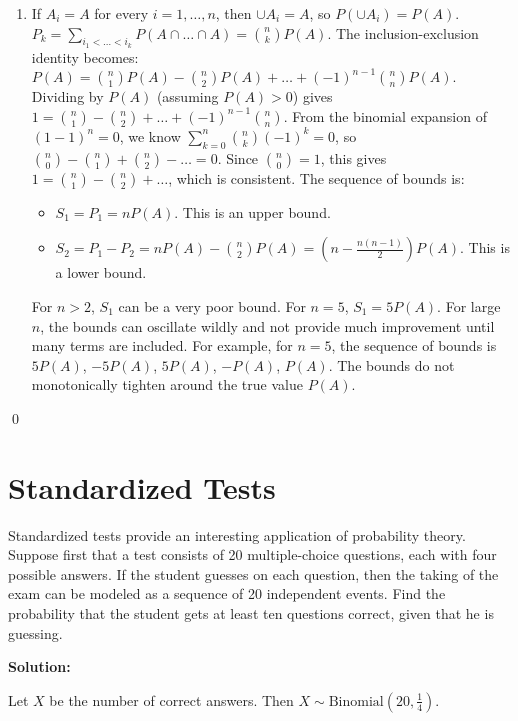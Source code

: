 \begin{enumerate}[label=(\alph*)]
    \item If $A_i=A$ for every $i=1, \dots, n$, then $\cup A_i = A$, so $P(\cup A_i) = P(A)$.
    $P_k = \sum_{i_1 < \dots < i_k} P(A \cap \dots \cap A) = \binom{n}{k} P(A)$.
    The inclusion-exclusion identity becomes: $P(A) = \binom{n}{1}P(A) - \binom{n}{2}P(A) + \dots + (-1)^{n-1}\binom{n}{n}P(A)$.
    Dividing by $P(A)$ (assuming $P(A)>0$) gives $1 = \binom{n}{1} - \binom{n}{2} + \dots + (-1)^{n-1}\binom{n}{n}$.
    From the binomial expansion of $(1-1)^n = 0$, we know $\sum_{k=0}^n \binom{n}{k}(-1)^k = 0$, so $\binom{n}{0} - \binom{n}{1} + \binom{n}{2} - \dots = 0$. Since $\binom{n}{0}=1$, this gives $1 = \binom{n}{1} - \binom{n}{2} + \dots$, which is consistent.
    \vspace{1ex} %
    The sequence of bounds is:
    \begin{itemize}
        \item $S_1 = P_1 = nP(A)$. This is an upper bound.
        \item $S_2 = P_1 - P_2 = nP(A) - \binom{n}{2}P(A) = (n - \frac{n(n-1)}{2})P(A)$. This is a lower bound.
    \end{itemize}
    For $n > 2$, $S_1$ can be a very poor bound. For $n=5$, $S_1=5P(A)$. For large $n$, the bounds can oscillate wildly and not provide much improvement until many terms are included. For example, for $n=5$, the sequence of bounds is $5P(A)$, $-5P(A)$, $5P(A)$, $-P(A)$, $P(A)$. The bounds do not monotonically tighten around the true value $P(A)$.
\end{enumerate}


\qed
\section{Standardized Tests}

\begin{problembox}
Standardized tests provide an interesting application of probability theory. Suppose first that a test consists of 20 multiple-choice questions, each with four possible answers. If the student guesses on each question, then the taking of the exam can be modeled as a sequence of 20 independent events. Find the probability that the student gets at least ten questions correct, given that he is guessing.
\end{problembox}

\noindent\textbf{Solution:}

Let $X$ be the number of correct answers. Then $X \sim \text{Binomial}(20, \frac{1}{4})$.

